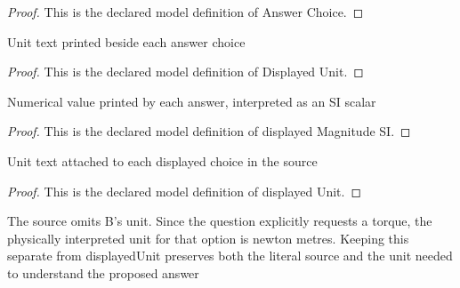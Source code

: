 \begin{proof}
  This is the declared model definition of Answer Choice.
\end{proof}
\begin{definition}
  \label{def:physics:phyx-mini-0996:phyxminiproblems-problemphyxmini0996-displayedunit}
  Unit text printed beside each answer choice
\end{definition}
\begin{proof}
  This is the declared model definition of Displayed Unit.
\end{proof}
\begin{definition}
  \label{def:physics:phyx-mini-0996:phyxminiproblems-problemphyxmini0996-answerchoice-displayedmagnitudesi}
  Numerical value printed by each answer, interpreted as an SI scalar
\end{definition}
\begin{proof}
  This is the declared model definition of displayed Magnitude SI.
\end{proof}
\begin{definition}
  \label{def:physics:phyx-mini-0996:phyxminiproblems-problemphyxmini0996-answerchoice-displayedunit}
  Unit text attached to each displayed choice in the source
\end{definition}
\begin{proof}
  This is the declared model definition of displayed Unit.
\end{proof}
\begin{definition}
  \label{def:physics:phyx-mini-0996:phyxminiproblems-problemphyxmini0996-answerchoice-interpretedunitfortorquequestion}
  The source omits B's unit. Since the question explicitly requests a torque, the physically interpreted unit for that option is newton metres. Keeping this separate from displayedUnit preserves both the literal source and the unit needed to understand the proposed answer
\end{definition}
